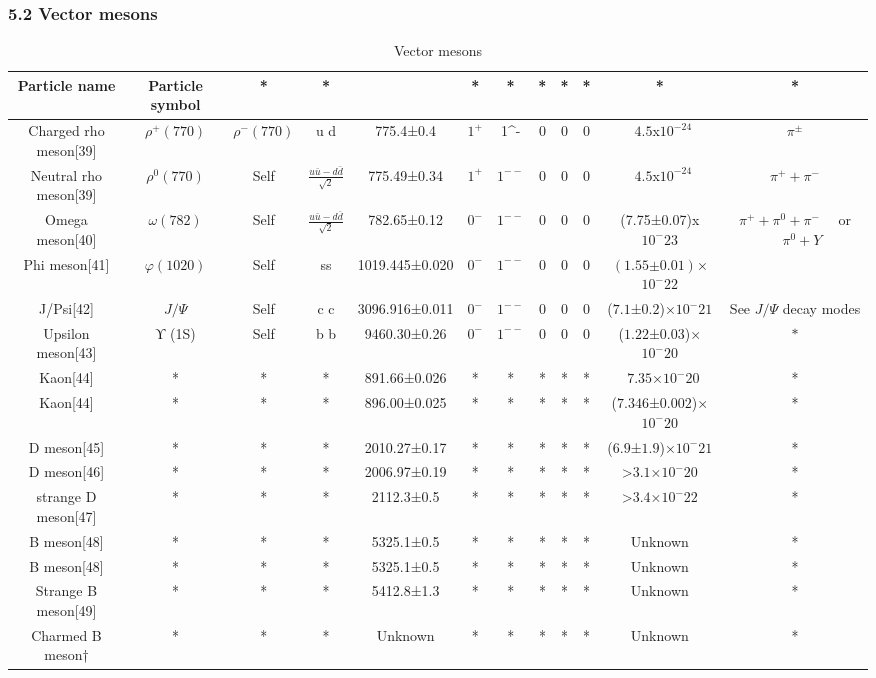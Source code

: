 \subsubsection{5.2 Vector mesons}
\begin{table}[ht]
\centering
\caption{Vector mesons}\label{tab_JZ6}
\begin{tabular}{|c|c|c|c|c|c|c|c|c|c|c|c|}
\hline
Particle name & Particle
symbol & * & * & & * & * & * & * & * & * & * \\
\hline
Charged rho meson[39] & $\rho^+(770)$ & $\rho^-(770)$ & u d &  775.4±0.4   & $1^+$ & 1^- & 0 &0 & 0 & ~$4.5$x$10^{-24}$ & $\pi^\pm$ \\
\hline
Neutral rho meson[39] & $\rho^0(770)$ & Self & $\frac{u\bar u-d\bar d}{\sqrt{2}}$ & 775.49±0.34  & $1^+$ & $1^{--}$ & 0 & 0 & 0 & ~$4.5$x$10^{-24}$ & $\pi^+ +\pi^-$ \\
\hline
Omega meson[40] &  $\omega(782)$&Self &  $\frac{u\bar u-d\bar d}{\sqrt{2}}$& 782.65±0.12  & $0^-$ & $1^{--}$ & 0 & 0 &0 &(7.75±0.07)x$10^-{23}$& $\pi^+ +\pi^0 +\pi^-  \quad$ or$\quad \pi^0+Y$\\
\hline
Phi meson[41] & $\varphi(1020)$ & Self & ss &  1019.445±0.020&  $0^-$ & $1^{--}$  & 0 & 0 & 0& $(1.55\text{±}0.01)$×$10^-22$ &  \\
\hline
J/Psi[42] & $J/\Psi$ & Self & c c &  3096.916±0.011 & $0^-$ & $1^{--}$  & 0 & 0 & 0 & ($7.1$±$0.2$)×$10^-21$ & See $J/\Psi$  decay modes\\
\hline


Upsilon meson[43] &ϒ (1S)	 & Self & b b &   9460.30±0.26& $0^-$ & $1^{--}$ &0 & 0 &0& ($1.22$±$0.03$)×$10^-20$ &$ *$ \\
\hline
Kaon[44] & * & * & * &   891.66±0.026 & * & * & * & * & * & ~$7.35$×$10^-20$ & * \\
\hline
Kaon[44] & * & * & * &  896.00±0.025 & * & * & * & * & * & ($7.346$±$0.002$)×$10^-20$ & * \\
\hline
D meson[45] & * & * & * &	2010.27±0.17   & * & * & * & * & * & ($6.9$±$1.9$)×$10^-21$ & * \\
\hline
D meson[46] & * & * & * & 2006.97±0.19& * & * & * & * & * & >$3.1$×$10^-20$ & * \\
\hline
strange D meson[47]	 & * & * & * & 2112.3±0.5 & * & * & * & * & * & >$3.4$×$10^-22$& * \\
\hline
B meson[48] & * & * & * &5325.1±0.5 & * & * & * & * & * & Unknown & * \\
\hline
B meson[48] & * & * & * &5325.1±0.5 & * & * & * & * & * & Unknown & * \\
\hline
Strange B meson[49] & * & * & * &5412.8±1.3 & * & * & * & * & * & Unknown& * \\
\hline
Charmed B meson† & * & * & * & Unknown& * & * & * & * & * & Unknown & * \\
\hline
\end{tabular}
\end{table}